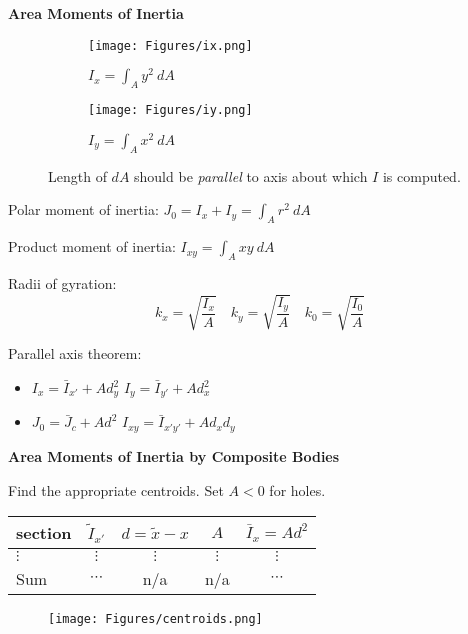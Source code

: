 \documentclass[twocolumn]{article}
\begin{document}
\dotfill

\textbf{Area Moments of Inertia}

\begin{figure}[h]
    \centering
    \begin{subfigure}{0.45\columnwidth}
        \centering
        \texttt{[image: Figures/ix.png]}
        \caption{$I_x = \displaystyle\int_A y^2\ dA$}
    \end{subfigure}
    \hfill
    \begin{subfigure}{0.45\columnwidth}
        \centering
        \texttt{[image: Figures/iy.png]}
        \caption{$I_y = \displaystyle\int_A x^2\ dA$}
    \end{subfigure}
    \caption{Length of $dA$ should be \textit{parallel} to axis about which $I$ is computed.}
\end{figure}

Polar moment of inertia: $J_0 = I_x + I_y = \displaystyle\int_A r^2\ dA$

Product moment of inertia: $I_{xy} = \displaystyle\int_A xy\ dA$

Radii of gyration:
\begin{equation*}
    k_x = \sqrt{\frac{I_x}{A}} \hspace{1em} k_y = \sqrt{\frac{I_y}{A}} \hspace{1em} k_0 = \sqrt{\frac{I_0}{A}}
\end{equation*}

Parallel axis theorem:

\begin{itemize}
    \item $I_x = \bar{I}_{x'} + Ad_y^2$ \hfill $I_y = \bar{I}_{y'} + Ad_x^2$
    \item $J_0 = \bar{J}_c + Ad^2$ \hfill $I_{xy} = \bar{I}_{x'y'} + A d_x d_y$
\end{itemize}

\dotfill

\textbf{Area Moments of Inertia by Composite Bodies}

Find the appropriate centroids. Set $A < 0$ for holes.
\begin{table}[h]
    \begin{tabular}{l c c c c}
        \hline \hline
        section & $\tilde{I}_{x'}$ & $d = \tilde{x} - x$ & $A$ & $\bar{I}_x = Ad^2$ \\
        \hline
        $\vdots$ & $\vdots$ & $\vdots$ & $\vdots$ & $\vdots$ \\
        \hline
        Sum & $\cdots$ & n/a & n/a & $\cdots$ \\
        \hline \hline
    \end{tabular}
\end{table}

\newpage

\begin{figure}[h]
    \texttt{[image: Figures/centroids.png]}
\end{figure}
\end{document}
